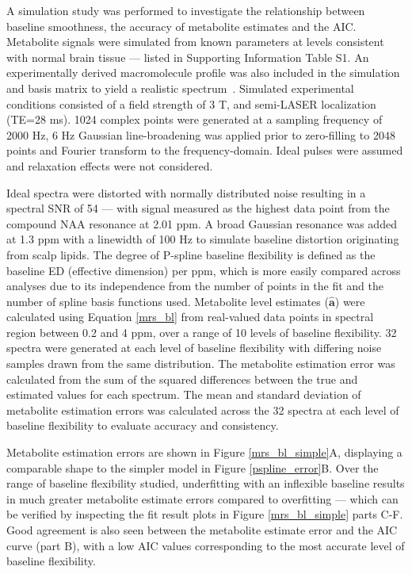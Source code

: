 \documentclass[num-refs]{wiley-article}
\begin{document}
A simulation study was performed to investigate the relationship between baseline smoothness, the accuracy of metabolite estimates and the AIC. Metabolite signals were simulated from known parameters \cite{Govind2015} at levels consistent with normal brain tissue \cite{deGraaf2018} --- listed in Supporting Information Table S1. An experimentally derived macromolecule profile was also included in the simulation and basis matrix to yield a realistic spectrum~\cite{Birch2017}. Simulated experimental conditions consisted of a field strength of 3 T, and semi-LASER localization (TE=28 ms). 1024 complex points were generated at a sampling frequency of 2000 Hz, 6 Hz Gaussian line-broadening was applied prior to zero-filling to 2048 points and Fourier transform to the frequency-domain. Ideal pulses were assumed and relaxation effects were not considered.

Ideal spectra were distorted with normally distributed noise resulting in a spectral SNR of 54 --- with signal measured as the highest data point from the compound NAA resonance at 2.01 ppm. A broad Gaussian resonance was added at 1.3 ppm with a linewidth of 100 Hz to simulate baseline distortion originating from scalp lipids. The degree of P-spline baseline flexibility is defined as the baseline ED (effective dimension) per ppm, which is more easily compared across analyses due to its independence from the number of points in the fit and the number of spline basis functions used. Metabolite level estimates ($\hat{\mathbf{a}}$) were calculated using Equation \ref{mrs_bl} from real-valued data points in spectral region between 0.2 and 4 ppm, over a range of 10 levels of baseline flexibility. 32 spectra were generated at each level of baseline flexibility with differing noise samples drawn from the same distribution. The metabolite estimation error was calculated from the sum of the squared differences between the true and estimated values for each spectrum. The mean and standard deviation of metabolite estimation errors was calculated across the 32 spectra at each level of baseline flexibility to evaluate accuracy and consistency.

Metabolite estimation errors are shown in Figure \ref{mrs_bl_simple}A, displaying a comparable shape to the simpler model in Figure \ref{pspline_error}B. Over the range of baseline flexibility studied, underfitting with an inflexible baseline results in much greater metabolite estimate errors compared to overfitting --- which can be verified by inspecting the fit result plots in Figure \ref{mrs_bl_simple} parts C-F. Good agreement is also seen between the metabolite estimate error and the AIC curve (part B), with a low AIC values corresponding to the most accurate level of baseline flexibility.
\end{document}
